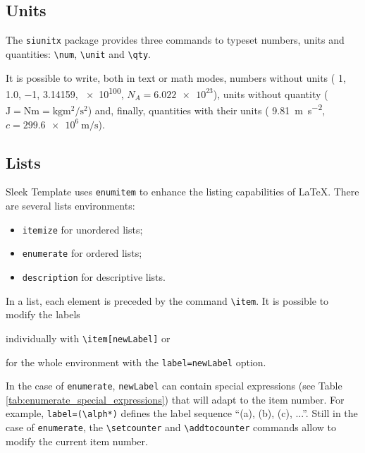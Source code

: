 \documentclass[a4paper, 12pt]{report}
\def\tbs{\textbackslash}
\begin{document}
    \subsection{Units}

    The \texttt{siunitx} package \cite{wright2022siunitx} provides three commands to typeset numbers, units and quantities: \texttt{\tbs{}num}, \texttt{\tbs{}unit} and \texttt{\tbs{}qty}.

    It is possible to write, both in text or math modes, numbers without units (\eg{} \num{1}, \num{1.0}, \num{-1}, \num{3.14159}, \num{e100}, $N_A = \num{6.022e23}$), units without quantity (\eg{} $\unit{\joule} = \unit{\newton\meter} = \unit{\kilogram\meter\squared\per\second\squared}$) and, finally, quantities with their units (\eg{} \qty{9.81}{\meter\per\second\squared}, $c = \qty{299.6e6}{\meter\per\second}$).

    \subsection{Lists}

    Sleek Template uses \texttt{enumitem} to enhance the listing capabilities of \LaTeX{}. There are several lists environments:
    \begin{itemize}[noitemsep]
        \item \texttt{itemize} for unordered lists;
        \item \texttt{enumerate} for ordered lists;
        \item \texttt{description} for descriptive lists.
    \end{itemize}

    In a list, each element is preceded by the command \texttt{\tbs{}item}. It is possible to modify the labels
    \begin{enumerate*}
        \item individually with \texttt{\tbs{}item[newLabel]} or
        \item for the whole environment with the \texttt{label=newLabel} option.
    \end{enumerate*}

    In the case of \texttt{enumerate}, \texttt{newLabel} can contain special expressions (see Table \ref{tab:enumerate_special_expressions}) that will adapt to the item number. For example, \texttt{label=(\tbs{}alph*)} defines the label sequence \enquote{(a), (b), (c), ...}. Still in the case of \texttt{enumerate}, the  \texttt{\tbs{}setcounter} and \texttt{\tbs{}addtocounter} commands allow to modify the current item number.
\end{document}
